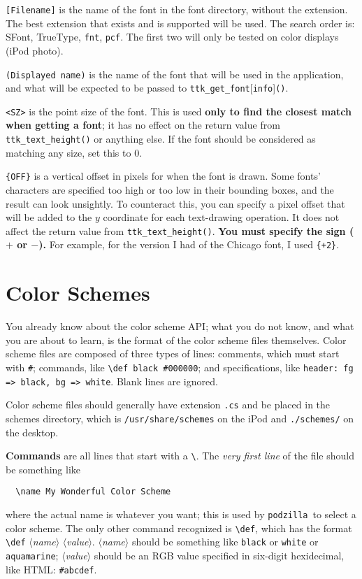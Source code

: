 \documentclass[12pt,letterpaper]{report}
\def\pz{\texttt{podzilla}}
\let\ttt\tt
\def\tt{\def\_{{\ttt\char`\_}}\ttt}
\def\texttt#1{{\tt #1}}
\def\<#1>{\leavevmode\hbox{$\langle${\sl#1\/}$\rangle$}}
\begin{document}
\verb|[Filename]| is the name of the font in the font directory, without the extension. The best extension that exists and
is supported will be used. The search order is: SFont, TrueType, \verb|fnt|, \verb|pcf|. The first two
will only be tested on color displays (iPod photo).

\verb|(Displayed name)| is the name of the font that will be used in the application, and what will be expected to be passed
to \verb|ttk_get_font|[\verb|info|]\verb|()|.

\verb|<SZ>| is the point size of the font. This is used {\bf only to find the closest match when getting a font}; it
has no effect on the return value from \verb|ttk_text_height()| or anything else. If the font should be considered
as matching any size, set this to 0.

\verb|{OFF}| is a vertical offset in pixels for when the font is drawn. Some fonts' characters are specified too
high or too low in their bounding boxes, and the result can look unsightly. To counteract this, you can specify
a pixel offset that will be added to the $y$ coordinate for each text-drawing operation. It does not affect
the return value from \verb|ttk_text_height()|. {\bf You must specify the sign ($+$ or $-$).} For example, for the version
I had of the Chicago font, I used \verb|{+2}|.

\section{Color Schemes}
You already know about the color scheme API; what you do not know, and what you are about to learn, is the format
of the color scheme files themselves. Color scheme files are composed of three types of lines: comments, which must
start with {\tt \#}; commands, like \verb|\def black #000000|; and specifications, like
\verb|header: fg => black, bg => white|. Blank lines are ignored.

Color scheme files should generally have extension \verb|.cs| and be placed in the schemes directory, which is
\verb|/usr/share/schemes| on the iPod and \verb|./schemes/| on the desktop.

{\bf Commands} are all lines that start with a \verb|\|. The {\it very first line} of the file should be
something like
\begin{verbatim}
  \name My Wonderful Color Scheme
\end{verbatim}
where the actual name is whatever you want; this is used by \pz\ to select a color scheme.
The only other command recognized is \verb|\def|, which has the format \verb|\def| \<name> \<value>.
\<name> should be something like \verb|black| or \verb|white| or \verb|aquamarine|; \<value> should
be an RGB value specified in six-digit hexidecimal, like HTML: \verb|#abcdef|.
\end{document}
